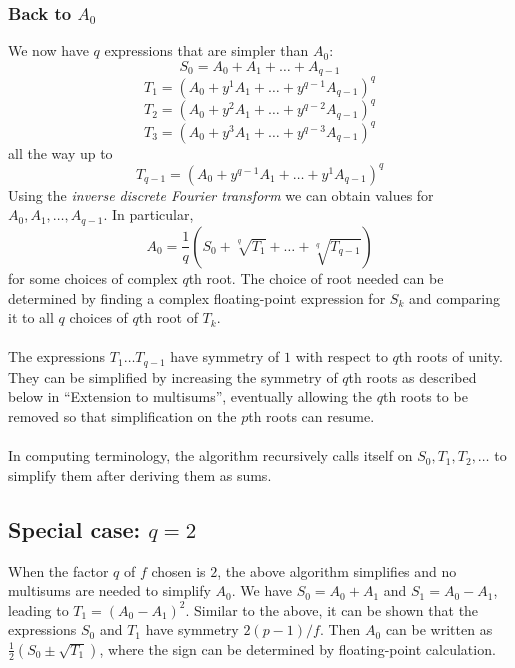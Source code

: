 \documentclass{article}
\begin{document}
\subsubsection{Back to $ A_0 $}
    We now have $ q $ expressions that are simpler than $ A_0 $:
    $$ S_0 = A_0 + A_1 + \dots + A_{q - 1} $$
    $$ T_1 = (A_0 + y^1 A_1 + \dots + y^{q - 1} A_{q - 1})^q $$
    $$ T_2 = (A_0 + y^2 A_1 + \dots + y^{q - 2} A_{q - 1})^q $$
    $$ T_3 = (A_0 + y^3 A_1 + \dots + y^{q - 3} A_{q - 1})^q $$
    all the way up to
    $$ T_{q - 1} = (A_0 + y^{q - 1} A_1 + \dots + y^1 A_{q - 1})^q $$
    Using the \textit{inverse discrete Fourier transform} we can obtain values for $ A_0, A_1, \dots, A_{q - 1} $. In particular,
    $$ A_0 = \frac{1}{q} (S_0 + \sqrt[q]{T_1} + \dots + \sqrt[q]{T_{q - 1}}) $$
    for some choices of complex $ q $th root. The choice of root needed can be determined by finding a complex floating-point expression for $ S_k $ and comparing it to all $ q $ choices of $ q $th root of $ T_k $.\\
    \\
    The expressions $ T_1 \dots T_{q - 1} $ have symmetry of $ 1 $ with respect to $ q $th roots of unity. They can be simplified by increasing the symmetry of $ q $th roots as described below in ``Extension to multisums'', eventually allowing the $ q $th roots to be removed so that simplification on the $ p $th roots can resume.\\
    \\
    In computing terminology, the algorithm recursively calls itself on $ S_0, T_1, T_2, \dots $ to simplify them after deriving them as sums.\\
\subsection{Special case: $ q = 2 $}
    When the factor $ q $ of $ f $ chosen is $ 2 $, the above algorithm simplifies and no multisums are needed to simplify $ A_0 $. We have $ S_0 = A_0 + A_1 $ and $ S_1 = A_0 - A_1 $, leading to $ T_1 = (A_0 - A_1)^2 $. Similar to the above, it can be shown that the expressions $ S_0 $ and $ T_1 $ have symmetry $ 2(p - 1)/f $. Then $ A_0 $ can be written as $ \frac{1}{2} (S_0 \pm \sqrt{T_1}) $, where the sign can be determined by floating-point calculation.\\
\end{document}
